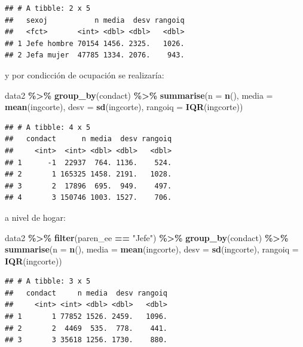 \documentclass[
  12pt,
]{book}
\newenvironment{Shaded}{\begin{snugshade}}{\end{snugshade}}
\newcommand{\AttributeTok}[1]{\textcolor[rgb]{0.13,0.29,0.53}{#1}}
\newcommand{\FunctionTok}[1]{\textcolor[rgb]{0.13,0.29,0.53}{\textbf{#1}}}
\newcommand{\NormalTok}[1]{#1}
\newcommand{\SpecialCharTok}[1]{\textcolor[rgb]{0.81,0.36,0.00}{\textbf{#1}}}
\newcommand{\StringTok}[1]{\textcolor[rgb]{0.31,0.60,0.02}{#1}}
\begin{document}
\begin{verbatim}
## # A tibble: 2 x 5
##   sexoj           n media  desv rangoiq
##   <fct>       <int> <dbl> <dbl>   <dbl>
## 1 Jefe hombre 70154 1456. 2325.   1026.
## 2 Jefa mujer  47785 1334. 2076.    943.
\end{verbatim}

y por condicción de ocupación se realizaría:

\begin{Shaded}
\begin{Highlighting}[]
\NormalTok{data2 }\SpecialCharTok{\%\textgreater{}\%} \FunctionTok{group\_by}\NormalTok{(condact) }\SpecialCharTok{\%\textgreater{}\%}
  \FunctionTok{summarise}\NormalTok{(}\AttributeTok{n =} \FunctionTok{n}\NormalTok{(),}
            \AttributeTok{media =} \FunctionTok{mean}\NormalTok{(ingcorte),}
            \AttributeTok{desv =} \FunctionTok{sd}\NormalTok{(ingcorte),}
            \AttributeTok{rangoiq =} \FunctionTok{IQR}\NormalTok{(ingcorte))}
\end{Highlighting}
\end{Shaded}

\begin{verbatim}
## # A tibble: 4 x 5
##   condact      n media  desv rangoiq
##     <int>  <int> <dbl> <dbl>   <dbl>
## 1      -1  22937  764. 1136.    524.
## 2       1 165325 1458. 2191.   1028.
## 3       2  17896  695.  949.    497.
## 4       3 150746 1003. 1527.    706.
\end{verbatim}

a nivel de hogar:

\begin{Shaded}
\begin{Highlighting}[]
\NormalTok{data2 }\SpecialCharTok{\%\textgreater{}\%} \FunctionTok{filter}\NormalTok{(paren\_ee }\SpecialCharTok{==} \StringTok{"Jefe"}\NormalTok{) }\SpecialCharTok{\%\textgreater{}\%} 
  \FunctionTok{group\_by}\NormalTok{(condact) }\SpecialCharTok{\%\textgreater{}\%}
  \FunctionTok{summarise}\NormalTok{(}\AttributeTok{n =} \FunctionTok{n}\NormalTok{(),}
            \AttributeTok{media =} \FunctionTok{mean}\NormalTok{(ingcorte),}
            \AttributeTok{desv =} \FunctionTok{sd}\NormalTok{(ingcorte),}
            \AttributeTok{rangoiq =} \FunctionTok{IQR}\NormalTok{(ingcorte))}
\end{Highlighting}
\end{Shaded}

\begin{verbatim}
## # A tibble: 3 x 5
##   condact     n media  desv rangoiq
##     <int> <int> <dbl> <dbl>   <dbl>
## 1       1 77852 1526. 2459.   1096.
## 2       2  4469  535.  778.    441.
## 3       3 35618 1256. 1730.    880.
\end{verbatim}
\end{document}
